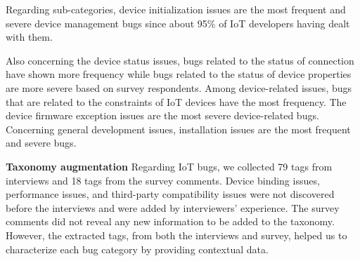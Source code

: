 Regarding sub-categories, device initialization issues are the most frequent and severe device management bugs since about 95\% of IoT developers having dealt with them.

Also concerning the device status issues, bugs related to the status of connection have shown more frequency while bugs related to the status of device properties are more severe based on survey respondents. Among device-related issues, bugs that are related to the constraints of IoT devices have the most frequency. The device firmware exception issues are the most severe device-related bugs. Concerning general development issues, installation issues are the most frequent and severe bugs. 



\textbf{Taxonomy augmentation}
Regarding IoT bugs, we collected 79 tags from interviews and 18 tags from the survey comments. Device binding issues, performance issues, and third-party compatibility issues were not discovered before the interviews and were added by interviewers' experience. The survey comments did not reveal any new information to be added to the taxonomy. However, the extracted tags, from both the interviews and survey, helped us to characterize each bug category by providing contextual data.




\endinput

